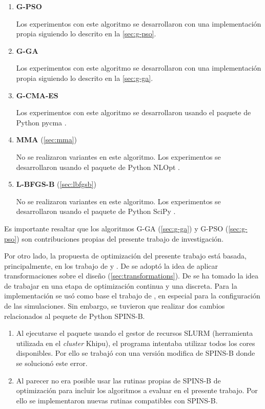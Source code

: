 \begin{enumerate}
  \item \textbf{G-PSO}
  
  Los experimentos con este algoritmo se desarrollaron con una implementación propia siguiendo lo descrito
    en la \autoref{sec:g-pso}.

  \item \textbf{G-GA}


  Los experimentos con este algoritmo se desarrollaron con una implementación propia siguiendo lo descrito
    en la \autoref{sec:g-ga}.

  \item \textbf{G-CMA-ES}

  Los experimentos con este algoritmo se desarrollaron usando el paquete de Python pycma
  \citep{hansen2019pycma}.

  \item \textbf{MMA} (\autoref{sec:mma})

  No se realizaron variantes en este algoritmo.
  Los experimentos se desarrollaron usando el paquete de Python NLOpt \citep{nlopt}.

  \item \textbf{L-BFGS-B} (\autoref{sec:lbfgsb})

  No se realizaron variantes en este algoritmo.
  Los experimentos se desarrollaron usando el paquete de Python SciPy \citep{2020SciPy-NMeth}.

\end{enumerate}

Es importante resaltar que los algoritmos G-GA (\autoref{sec:g-ga}) y G-PSO (\autoref{sec:g-pso})
son contribuciones propias del presente trabajo de investigación.

Por otro lado, la propuesta de optimización del presente trabajo está basada, principalmente, en los trabajo de \cite{Su2020} y \cite{Christiansen2021}.
De \cite{Christiansen2021} se adoptó la idea de aplicar transformaciones sobre el diseño
(\autoref{sec:transformations}).
De \cite{Su2020} se ha tomado la idea de trabajar en una etapa de optimización continua y una discreta.
Para la implementación se usó como base el trabajo de \cite{Su2020}, en especial
para la configuración de las simulaciones. Sin embargo, se tuvieron que realizar
dos cambios relacionados al pequete de Python SPINS-B.

\begin{enumerate}
  \item Al ejecutarse el paquete usando el gestor de recursos SLURM (herramienta utilizada en el
        \emph{cluster} Khipu), el programa intentaba utilizar todos los cores disponibles.
        Por ello se trabajó con una versión modifica de SPINS-B donde se solucionó este error.
  \item Al parecer no era posible usar las rutinas propias de SPINS-B de optimización para incluir los algoritmos
        a evaluar en el presente trabajo. Por ello se implementaron nuevas rutinas compatibles con SPINS-B.
\end{enumerate}

